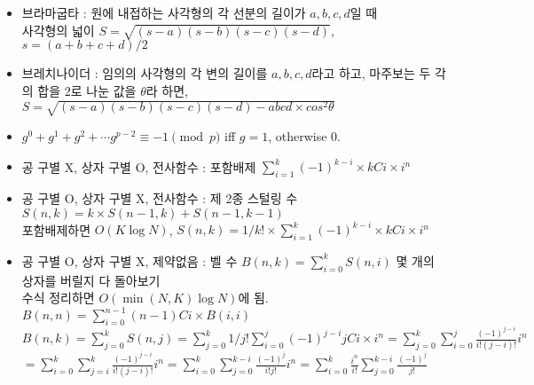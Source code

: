 \documentclass[landscape, 8pt, a4paper, oneside, twocolumn]{extarticle}
\begin{document}
\begin{itemize}
\item 브라마굽타 : 원에 내접하는 사각형의 각 선분의 길이가 $a, b, c, d$일 때\\
사각형의 넓이 $S=\sqrt{(s-a)(s-b)(s-c)(s-d)}$, $s=(a+b+c+d)/2$

\item 브레치나이더 : 임의의 사각형의 각 변의 길이를 $a,b,c,d$라고 하고, 마주보는 두 각의 합을 2로 나눈 값을 $\theta$라 하면, $S=\sqrt{(s-a)(s-b)(s-c)(s-d)-abcd\times cos^2 \theta}$

\item $g^0+g^1+g^2+\cdots g^{p-2}\equiv -1 \pmod p$ iff $g=1$, otherwise $0$.

\end{itemize}

{}{}{}{}{}
\begin{itemize}
\setlength\itemsep{0.1em}

\item 공 구별 X, 상자 구별 O, 전사함수 : 포함배제 $\sum_{i=1}^{k} (-1)^{k-i} \times kCi \times i^n$
\item 공 구별 O, 상자 구별 X, 전사함수 : 제 2종 스털링 수 $S(n,k)=k\times S(n-1,k) + S(n-1, k-1)$\\
포함배제하면 $O(K \log N)$, $S(n,k) = 1/k! \times \sum_{i=1}^{k} (-1)^{k-i} \times kCi \times i^n$
\item 공 구별 O, 상자 구별 X, 제약없음 : 벨 수 $B(n,k) = \sum_{i=0}^{k} S(n,i)$ 몇 개의 상자를 버릴지 다 돌아보기\\
수식 정리하면 $O(\min(N,K)\log N)$에 됨. $B(n,n) = \sum_{i=0}^{n-1} (n-1)Ci \times B(i,i)$\\
$B(n,k)=\sum_{j=0}^{k}S(n,j) = \sum_{j=0}^{k} 1/j! \sum_{i=0}^{j} (-1)^{j-i} jCi \times i^n=\sum_{j=0}^{k}\sum_{i=0}^{j} \frac{(-1)^{j-i}}{i!(j-i)!}i^n$\\
$=\sum_{i=0}^{k}\sum_{j=i}^{k}\frac{(-1)^{j-i}}{i!(j-i)!}i^n = \sum_{i=0}^{k}\sum_{j=0}^{k-i}\frac{(-1)^j}{i!j!}i^n = \sum_{i=0}^k \frac{i^n}{i!}\sum_{j=0}^{k-i} \frac{(-1)^j}{j!}$



\end{itemize}
\end{document}
